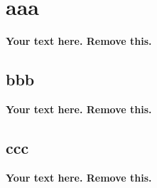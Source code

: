 \documentclass[11pt,a4]{article}
\begin{document}




\section{aaa} 

\textbf{
Your text here.
Remove this.
}
\lipsum[2-4]




\subsection{bbb}

\textbf{
Your text here.
Remove this.
}
\lipsum[2-4]




\subsection{ccc}

\textbf{
Your text here.
Remove this.
}
\lipsum[2-4]




\end{document}
